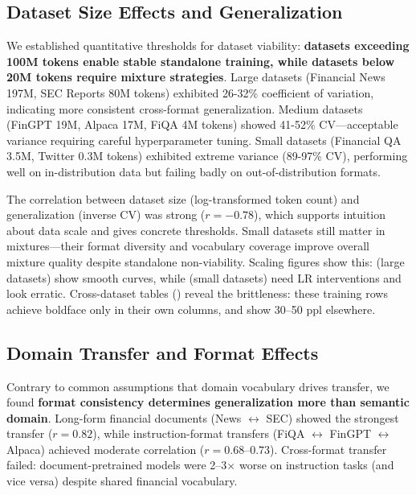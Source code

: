\subsection{Dataset Size Effects and Generalization}

We established quantitative thresholds for dataset viability: \textbf{datasets exceeding 100M tokens enable stable standalone training, while datasets below 20M tokens require mixture strategies}. Large datasets (Financial News 197M, SEC Reports 80M tokens) exhibited 26-32\% coefficient of variation, indicating more consistent cross-format generalization. Medium datasets (FinGPT 19M, Alpaca 17M, FiQA 4M tokens) showed 41-52\% CV—acceptable variance requiring careful hyperparameter tuning. Small datasets (Financial QA 3.5M, Twitter 0.3M tokens) exhibited extreme variance (89-97\% CV), performing well on in-distribution data but failing badly on out-of-distribution formats.

The correlation between dataset size (log-transformed token count) and generalization (inverse CV) was strong ($r = -0.78$), which supports intuition about data scale and gives concrete thresholds. Small datasets still matter in mixtures—their format diversity and vocabulary coverage improve overall mixture quality despite standalone non-viability. Scaling figures show this:  (large datasets) show smooth curves, while  (small datasets) need LR interventions and look erratic. Cross-dataset tables () reveal the brittleness: these training rows achieve boldface only in their own columns, and show 30--50 ppl elsewhere.

\subsection{Domain Transfer and Format Effects}

Contrary to common assumptions that domain vocabulary drives transfer, we found \textbf{format consistency determines generalization more than semantic domain}. Long-form financial documents (News $\leftrightarrow$ SEC) showed the strongest transfer ($r = 0.82$), while instruction-format transfers (FiQA $\leftrightarrow$ FinGPT $\leftrightarrow$ Alpaca) achieved moderate correlation ($r = 0.68$--$0.73$). Cross-format transfer failed: document-pretrained models were 2--3$\times$ worse on instruction tasks (and vice versa) despite shared financial vocabulary.

